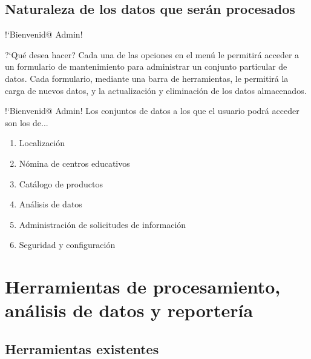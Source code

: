 \documentclass[xcolor=table, aspectratio=169]{beamer}
\begin{document}
\subsection{Naturaleza de los datos que ser\'an procesados}

\begin{frame}[t]{!`Bienvenid@ Admin!}
	\begin{block}{?`Qu\'e desea hacer?}
		Cada una de las opciones en el men\'u le permitir\'a acceder a un formulario de mantenimiento para administrar un conjunto particular de datos. Cada formulario, mediante una barra de herramientas, le permitir\'a la carga de nuevos datos, y la actualizaci\'on y eliminaci\'on de los datos almacenados.
	\end{block}
\end{frame}

\begin{frame}[t]{!`Bienvenid@ Admin!}
	Los conjuntos de datos a los que el usuario podr\'a acceder son los de...
	
	\begin{enumerate}
		\item Localizaci\'on
		\item N\'omina de centros educativos
		\item Cat\'alogo de productos
		\item An\'alisis de datos
		\item Administraci\'on de solicitudes de informaci\'on
		\item Seguridad y configuraci\'on
	\end{enumerate}
\end{frame}

\section{Herramientas de procesamiento, an\'alisis de datos y reporter\'ia}

\subsection{Herramientas existentes}
\end{document}
